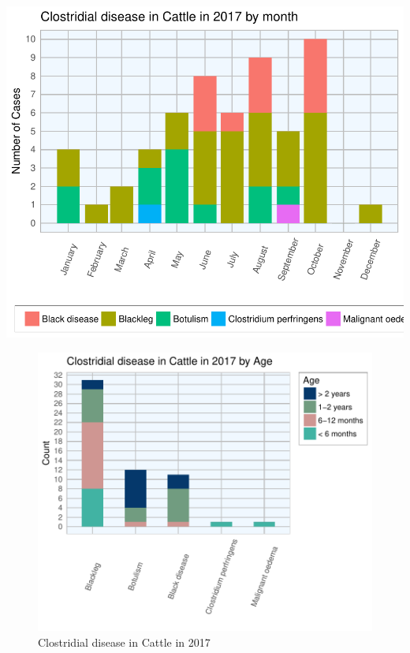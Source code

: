 \documentclass[]{book}
\begin{document}
\begin{center}\includegraphics{AFBI_files/figure-latex/unnamed-chunk-42-1} \end{center}

\begin{figure}

{\centering \includegraphics{AFBI_files/figure-latex/unnamed-chunk-44-1} 

}

\caption{Clostridial disease in Cattle in 2017}\label{fig:unnamed-chunk-44}
\end{figure}
\end{document}
